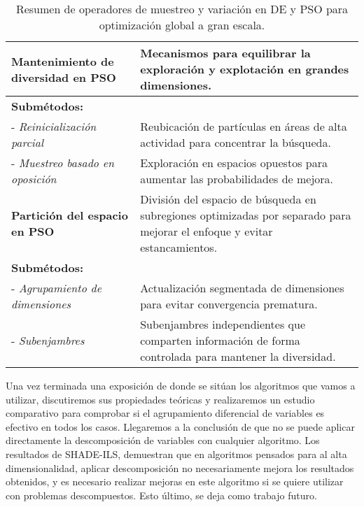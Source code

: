 \begin{table}[H]
{\begin{tabular}{|l|p{12cm}|}
\textbf{Mantenimiento de diversidad en PSO} & Mecanismos para equilibrar la exploración y explotación en grandes dimensiones. \\ \hline
\multicolumn{2}{|l|}{\textbf{Submétodos:}} \\ \hline
- \textit{Reinicialización parcial} & Reubicación de partículas en áreas de alta actividad para concentrar la búsqueda. \\ \hline
- \textit{Muestreo basado en oposición} & Exploración en espacios opuestos para aumentar las probabilidades de mejora. \\ \hline

\textbf{Partición del espacio en PSO} & División del espacio de búsqueda en subregiones optimizadas por separado para mejorar el enfoque y evitar estancamientos. \\ \hline
\multicolumn{2}{|l|}{\textbf{Submétodos:}} \\ \hline
- \textit{Agrupamiento de dimensiones} & Actualización segmentada de dimensiones para evitar convergencia prematura. \\ \hline
- \textit{Subenjambres} & Subenjambres independientes que comparten información de forma controlada para mantener la diversidad. \\ \hline

\end{tabular}%
}
\caption{Resumen de operadores de muestreo y variación en DE y PSO para optimización global a gran escala.}
\label{tab:sampling_variation}
\end{table}

Una vez terminada una exposición de donde se sitúan los algoritmos que vamos a utilizar, discutiremos sus propiedades teóricas y realizaremos un estudio comparativo para comprobar si el agrupamiento diferencial de variables es efectivo en todos los casos. Llegaremos a la conclusión de que no se puede aplicar directamente la descomposición de variables con cualquier algoritmo. Los resultados de SHADE-ILS, demuestran que en algoritmos pensados para al alta dimensionalidad, aplicar descomposición no necesariamente mejora los resultados obtenidos, y es necesario realizar mejoras en este algoritmo si se quiere utilizar con problemas descompuestos. Esto último, se deja como trabajo futuro.

\endinput
